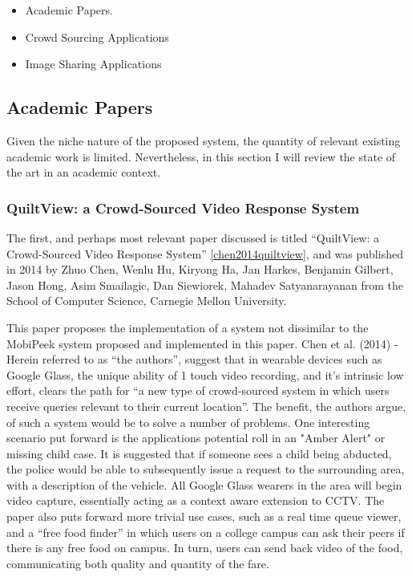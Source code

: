 \documentclass[a4paper]{article}
\begin{document}
\begin{itemize}
  \item Academic Papers.
  \item Crowd Sourcing Applications
  \item Image Sharing Applications
\end{itemize}

\subsection{Academic Papers}
Given the niche nature of the proposed system, the quantity of relevant existing academic work is limited. Nevertheless, in this section I will review the state of the art in an academic context.
\subsubsection{QuiltView: a Crowd-Sourced Video Response System}
The first, and perhaps most relevant paper discussed is titled ``QuiltView: a Crowd-Sourced Video Response System'' \ref{chen2014quiltview}, and was published in 2014 by Zhuo Chen, Wenlu Hu, Kiryong Ha, Jan Harkes, Benjamin Gilbert,
Jason Hong, Asim Smailagic, Dan Siewiorek, Mahadev Satyanarayanan from the School of Computer Science, Carnegie Mellon University.

This paper proposes the implementation of a system not dissimilar to the MobiPeek system proposed and implemented in this paper. Chen et al. (2014) - Herein referred to as ``the authors'', suggest that in wearable devices such as Google Glass, the unique ability of 1 touch video recording, and it's intrinsic low effort, clears the path for ``a new type of crowd-sourced system in which users receive queries relevant to their current location''.
The benefit, the authors argue, of such a system would be to solve a number of problems. One interesting scenario put forward is the applications potential roll in an "Amber Alert" or missing child case. It is suggested that if someone sees a child being abducted, the police would be able to subsequently issue a request to the surrounding area, with a description of the vehicle. All Google Glass wearers in the area will begin video capture, essentially acting as a context aware extension to CCTV.
The paper also puts forward more trivial use cases, such as a real time queue viewer, and a ``free food finder'' in which users on a college campus can ask their peers if there is any free food on campus. In turn, users can send back video of the food, communicating both quality and quantity of the fare.
\end{document}

